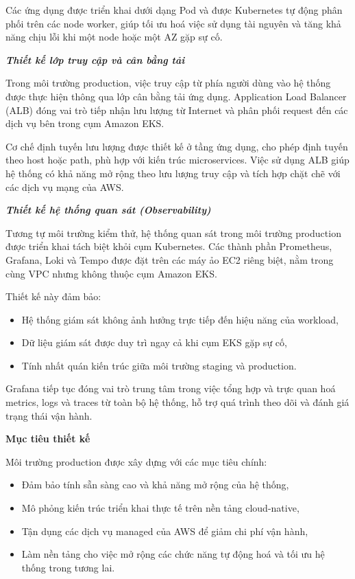 Các ứng dụng được triển khai dưới dạng Pod và được Kubernetes tự động phân phối
trên các node worker, giúp tối ưu hoá việc sử dụng tài nguyên và tăng khả năng chịu lỗi
khi một node hoặc một AZ gặp sự cố.

\textit{\textbf{Thiết kế lớp truy cập và cân bằng tải}}

Trong môi trường production, việc truy cập từ phía người dùng vào hệ thống được thực hiện
thông qua lớp cân bằng tải ứng dụng. Application Load Balancer (ALB) đóng vai trò tiếp nhận
lưu lượng từ Internet và phân phối request đến các dịch vụ bên trong cụm Amazon EKS.

Cơ chế định tuyến lưu lượng được thiết kế ở tầng ứng dụng, cho phép định tuyến theo host
hoặc path, phù hợp với kiến trúc microservices. Việc sử dụng ALB giúp hệ thống có khả năng
mở rộng theo lưu lượng truy cập và tích hợp chặt chẽ với các dịch vụ mạng của AWS.

\textit{\textbf{Thiết kế hệ thống quan sát (Observability)}}

Tương tự môi trường kiểm thử, hệ thống quan sát trong môi trường production được triển khai
tách biệt khỏi cụm Kubernetes. Các thành phần Prometheus, Grafana, Loki và Tempo được đặt
trên các máy ảo EC2 riêng biệt, nằm trong cùng VPC nhưng không thuộc cụm Amazon EKS.

Thiết kế này đảm bảo:
\begin{itemize}
    \item Hệ thống giám sát không ảnh hưởng trực tiếp đến hiệu năng của workload,
    \item Dữ liệu giám sát được duy trì ngay cả khi cụm EKS gặp sự cố,
    \item Tính nhất quán kiến trúc giữa môi trường staging và production.
\end{itemize}

Grafana tiếp tục đóng vai trò trung tâm trong việc tổng hợp và trực quan hoá metrics,
logs và traces từ toàn bộ hệ thống, hỗ trợ quá trình theo dõi và đánh giá trạng thái vận hành.

\textbf{Mục tiêu thiết kế}

Môi trường production được xây dựng với các mục tiêu chính:
\begin{itemize}
    \item Đảm bảo tính sẵn sàng cao và khả năng mở rộng của hệ thống,
    \item Mô phỏng kiến trúc triển khai thực tế trên nền tảng cloud-native,
    \item Tận dụng các dịch vụ managed của AWS để giảm chi phí vận hành,
    \item Làm nền tảng cho việc mở rộng các chức năng tự động hoá và tối ưu hệ thống trong tương lai.
\end{itemize}

